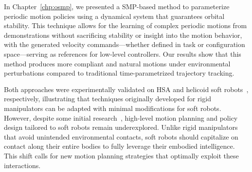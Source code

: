 In Chapter~\ref{chp:osmp}, we presented a \gls{SMP}-based method to parameterize periodic motion policies using a dynamical system that guarantees orbital stability. This technique allows for the learning of complex periodic motions from demonstrations without sacrificing stability or insight into the motion behavior, with the generated velocity commands—whether defined in task or configuration space—serving as references for low-level controllers. Our results show that this method produces more compliant and natural motions under environmental perturbations compared to traditional time-parametrized trajectory tracking.

Both approaches were experimentally validated on \gls{HSA} and helicoid soft robots~\citep{guan2023trimmed}, respectively, illustrating that techniques originally developed for rigid manipulators can be adapted with minimal modifications for soft robots. However, despite some initial research~\citep{goldman2014compliant, greer2020robust, selvaggio2020obstacle, rao2024towards, rao2024tendon}, high-level motion planning and policy design tailored to soft robots remain underexplored. Unlike rigid manipulators that avoid unintended environmental contacts, soft robots should capitalize on contact along their entire bodies to fully leverage their embodied intelligence. This shift calls for new motion planning strategies that optimally exploit these interactions.


